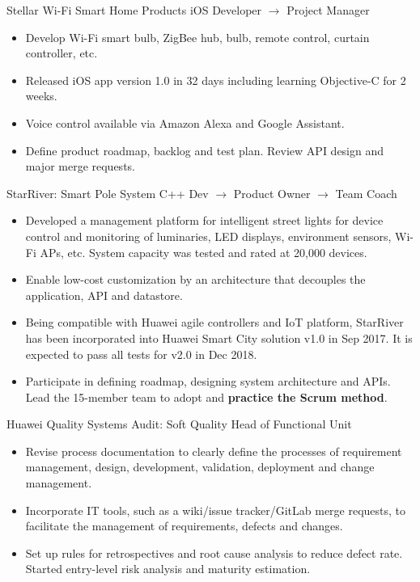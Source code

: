 \documentclass[11pt,a4paper]{moderncv/moderncv}
\begin{document}
{Stellar Wi-Fi Smart Home Products}
{iOS Developer $\rightarrow$ Project Manager}
{}{}
{
\begin{itemize}
	\item Develop Wi-Fi smart bulb, ZigBee hub, bulb, remote control, curtain controller, etc.
	\item Released  iOS app version 1.0 in 32 days including learning Objective-C for 2 weeks.
	\item Voice control available via Amazon Alexa and Google Assistant.
	\item Define product roadmap, backlog and test plan. Review API design and major merge requests.
\end{itemize}
}

{StarRiver: Smart Pole System}
{C++ Dev $\rightarrow$ Product Owner $\rightarrow$ Team Coach}
{}{}
{
\begin{itemize}
	\item Developed a management platform for intelligent street lights for device control and monitoring of luminaries, LED displays, environment sensors, Wi-Fi APs, etc. System capacity was tested and rated at 20,000 devices.
	\item Enable low-cost customization by an architecture that decouples the application, API and datastore.
	\item Being compatible with Huawei agile controllers and IoT platform, StarRiver has been incorporated into Huawei Smart City solution v1.0 in Sep 2017. It is expected to pass all tests for v2.0 in Dec 2018.
	\item Participate in defining roadmap, designing system architecture and APIs. Lead the 15-member team to adopt and \textbf{practice the Scrum method}.
\end{itemize}
}

{Huawei Quality Systems Audit: Soft Quality}
{Head of Functional Unit}
{}{}
{
\begin{itemize}
	\item Revise process documentation to clearly define the processes of requirement management, design, development, validation, deployment and change management.
	\item Incorporate IT tools, such as a wiki/issue tracker/GitLab merge requests, to facilitate the management of requirements, defects and changes.
	\item Set up rules for retrospectives and root cause analysis to reduce defect rate. Started entry-level risk analysis and maturity estimation.
\end{itemize}
}
\end{document}
